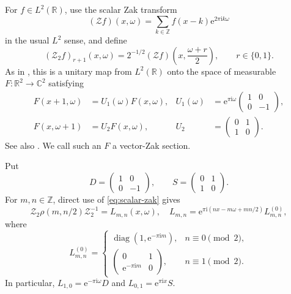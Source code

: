 \documentclass[11pt,reqno]{amsart}
\numberwithin{equation}{section}
\theoremstyle{definition}
\newcommand{\R}{\mathbb R}
\newcommand{\C}{\mathbb C}
\newcommand{\Z}{\mathbb Z}
\newcommand{\cZ}{\mathcal Z}
\newcommand{\cZtwo}{\mathcal Z_2}
\newcommand{\e}{\mathrm e}
\newcommand{\ii}{\mathrm i}
\begin{document}
For $f\in L^2(\R)$, use the scalar Zak transform
\begin{equation}\label{eq:scalar-zak}
 (\cZ f)(x,\omega)=\sum_{k\in\Z}f(x-k)\e^{2\pi\ii k\omega}
\end{equation}
in the usual $L^2$ sense, and define
\begin{equation}\label{eq:vector-zak}
 (\cZtwo f)_{r+1}(x,\omega)
 =2^{-1/2}(\cZ f)\left(x,\frac{\omega+r}{2}\right),
 \qquad r\in\{0,1\}.
\end{equation}
As in \cite[\S3]{FPPV2026}, this is a unitary map from $L^2(\R)$ onto the
space of measurable $F:\R^2\to\C^2$ satisfying
\begin{align}
 F(x+1,\omega)&=U_1(\omega)F(x,\omega),
 &U_1(\omega)&=\e^{\pi\ii\omega}
                   \begin{pmatrix}1&0\\0&-1\end{pmatrix},
 \label{eq:sewing-x}\\
 F(x,\omega+1)&=U_2F(x,\omega),
 &U_2&=\begin{pmatrix}0&1\\1&0\end{pmatrix}.
 \label{eq:sewing-w}
\end{align}
See also \cite{ZibZee97}.  We call such an $F$ a vector-Zak section.

Put
\[
 D=\begin{pmatrix}1&0\\0&-1\end{pmatrix},\qquad
 S=\begin{pmatrix}0&1\\1&0\end{pmatrix}.
\]
For $m,n\in\Z$, direct use of \eqref{eq:scalar-zak} gives
\begin{equation}\label{eq:half-lattice-action}
 \cZtwo\rho(m,n/2)\cZtwo^{-1}
 =L_{m,n}(x,\omega),\quad
 L_{m,n}=\e^{\pi\ii(nx-m\omega+mn/2)}L_{m,n}^{(0)},
\end{equation}
where
\[
 L_{m,n}^{(0)}=
 \begin{cases}
  \operatorname{diag}(1,\e^{-\pi\ii m}),&n\equiv0\pmod2,\\[1mm]
  \begin{pmatrix}0&1\\ \e^{-\pi\ii m}&0\end{pmatrix},
      &n\equiv1\pmod2.
 \end{cases}
\]
In particular, $L_{1,0}=\e^{-\pi\ii\omega}D$ and
$L_{0,1}=\e^{\pi\ii x}S$.
\end{document}
